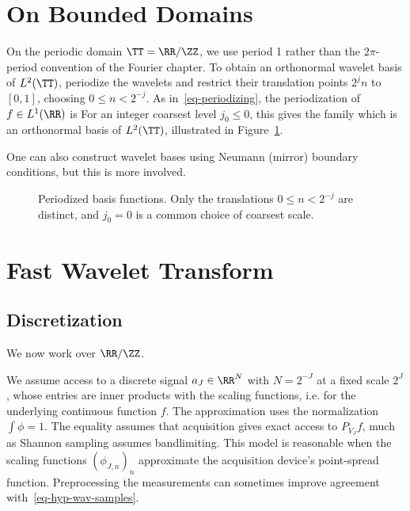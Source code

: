 \section{On Bounded Domains}

On the periodic domain $\TT=\RR/\ZZ$, we use period 1 rather than the $2\pi$-period convention of the Fourier chapter. To obtain an orthonormal wavelet basis of $L^2(\TT)$, periodize the wavelets and restrict their translation points $2^j n$ to $[0,1]$, choosing $0 \leq n < 2^{-j}$. As in~\eqref{eq-periodizing}, the periodization of $f \in L^1(\RR)$ is
For an integer coarsest level $j_0\leq0$, this gives the family
which is an orthonormal basis of $L^2(\TT)$, illustrated in Figure~\ref{fig-periodize}.
 
One can also construct wavelet bases using Neumann (mirror) boundary conditions, but this is more involved.



\begin{figure}[tbp]
\centering
{}\hfill
{}
\caption{Periodized basis functions. Only the translations $0\leq n<2^{-j}$ are distinct, and $j_0=0$ is a common choice of coarsest scale.}
\label{fig-periodize}
\end{figure}



                                                   
\section{Fast Wavelet Transform}\label{sec-fast-wavelet-transform}

   
\subsection{Discretization}

We now work over $\RR/\ZZ$.
 
We assume access to a discrete signal $a_J \in \RR^N$ with $N = 2^{-J}$ at a fixed scale $2^J$, whose entries are inner products with the scaling functions, i.e.
for the underlying continuous function $f$. The approximation uses the normalization $\int\phi=1$. The equality assumes that acquisition gives exact access to $P_{V_J}f$, much as Shannon sampling assumes bandlimiting. This model is reasonable when the scaling functions $(\phi_{J,n})_n$ approximate the acquisition device's point-spread function. Preprocessing the measurements can sometimes improve agreement with~\eqref{eq-hyp-wav-samples}.

